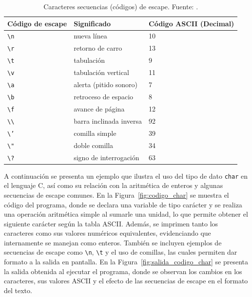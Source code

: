 \begin{table}[H]
    \centering
    \begin{tabular}{|p{3cm}|p{5cm}|p{4cm}|}
        \hline
        \textbf{Código de escape} & \textbf{Significado} & \textbf{Código ASCII (Decimal)} \\
        \hline

        \texttt{\textbackslash n} & nueva línea & 10 \\ \hline
        \texttt{\textbackslash r} & retorno de carro & 13 \\ \hline
        \texttt{\textbackslash t} & tabulación & 9 \\ \hline
        \texttt{\textbackslash v} & tabulación vertical & 11 \\ \hline
        \texttt{\textbackslash a} & alerta (pitido sonoro) & 7 \\ \hline
        \texttt{\textbackslash b} & retroceso de espacio & 8 \\ \hline
        \texttt{\textbackslash f} & avance de página & 12 \\ \hline
        \texttt{\textbackslash \textbackslash} & barra inclinada inversa & 92 \\ \hline
        \texttt{\textbackslash '} & comilla simple & 39 \\ \hline
        \texttt{\textbackslash "} & doble comilla & 34 \\ \hline
        \texttt{\textbackslash ?} & signo de interrogación & 63 \\ \hline

    \end{tabular}
    \caption{Caracteres secuencias (códigos) de escape. Fuente: \cite{frem_ref2}.}
    \label{tab:caracteres_secuencia}
\end{table}

A continuación se presenta un ejemplo que ilustra el uso del tipo de dato \texttt{char} en el lenguaje C, así como su relación con la aritmética de enteros y algunas secuencias de escape comunes. En la Figura~\ref{fig:codigo_char} se muestra el código del programa, donde se declara una variable de tipo carácter y se realiza una operación aritmética simple al sumarle una unidad, lo que permite obtener el siguiente carácter según la tabla ASCII. Además, se imprimen tanto los caracteres como sus valores numéricos equivalentes, evidenciando que internamente se manejan como enteros. También se incluyen ejemplos de secuencias de escape como \texttt{\textbackslash n}, \texttt{\textbackslash t} y el uso de comillas, las cuales permiten dar formato a la salida en pantalla. En la Figura~\ref{fig:salida_codigo_char} se presenta la salida obtenida al ejecutar el programa, donde se observan los cambios en los caracteres, sus valores ASCII y el efecto de las secuencias de escape en el formato del texto.

